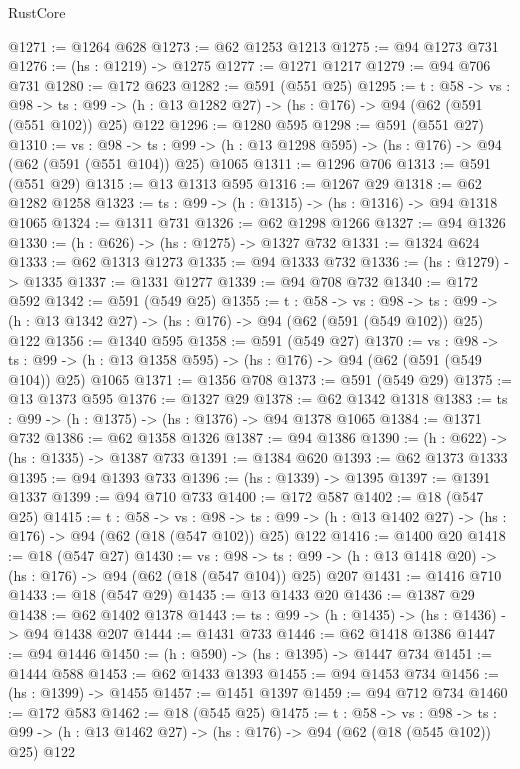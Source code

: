 \begin{lexlean}{RustCore}
\begin{coremodule}
@1271 := @1264 @628
@1273 := @62 @1253 @1213
@1275 := @94 @1273 @731
@1276 := (hs : @1219) -> @1275
@1277 := @1271 @1217
@1279 := @94 @706 @731
@1280 := @172 @623
@1282 := @591 (@551 @25)
@1295 := {t : @58} ->
  {vs : @98} ->
  {ts : @99} -> (h : @13 @1282 @27) -> (hs : @176) -> @94 (@62 (@591 (@551 @102)) @25) @122
@1296 := @1280 @595
@1298 := @591 (@551 @27)
@1310 := {vs : @98} ->
  {ts : @99} -> (h : @13 @1298 @595) -> (hs : @176) -> @94 (@62 (@591 (@551 @104)) @25) @1065
@1311 := @1296 @706
@1313 := @591 (@551 @29)
@1315 := @13 @1313 @595
@1316 := @1267 @29
@1318 := @62 @1282 @1258
@1323 := {ts : @99} -> (h : @1315) -> (hs : @1316) -> @94 @1318 @1065
@1324 := @1311 @731
@1326 := @62 @1298 @1266
@1327 := @94 @1326
@1330 := (h : @626) -> (hs : @1275) -> @1327 @732
@1331 := @1324 @624
@1333 := @62 @1313 @1273
@1335 := @94 @1333 @732
@1336 := (hs : @1279) -> @1335
@1337 := @1331 @1277
@1339 := @94 @708 @732
@1340 := @172 @592
@1342 := @591 (@549 @25)
@1355 := {t : @58} ->
  {vs : @98} ->
  {ts : @99} -> (h : @13 @1342 @27) -> (hs : @176) -> @94 (@62 (@591 (@549 @102)) @25) @122
@1356 := @1340 @595
@1358 := @591 (@549 @27)
@1370 := {vs : @98} ->
  {ts : @99} -> (h : @13 @1358 @595) -> (hs : @176) -> @94 (@62 (@591 (@549 @104)) @25) @1065
@1371 := @1356 @708
@1373 := @591 (@549 @29)
@1375 := @13 @1373 @595
@1376 := @1327 @29
@1378 := @62 @1342 @1318
@1383 := {ts : @99} -> (h : @1375) -> (hs : @1376) -> @94 @1378 @1065
@1384 := @1371 @732
@1386 := @62 @1358 @1326
@1387 := @94 @1386
@1390 := (h : @622) -> (hs : @1335) -> @1387 @733
@1391 := @1384 @620
@1393 := @62 @1373 @1333
@1395 := @94 @1393 @733
@1396 := (hs : @1339) -> @1395
@1397 := @1391 @1337
@1399 := @94 @710 @733
@1400 := @172 @587
@1402 := @18 (@547 @25)
@1415 := {t : @58} ->
  {vs : @98} ->
  {ts : @99} -> (h : @13 @1402 @27) -> (hs : @176) -> @94 (@62 (@18 (@547 @102)) @25) @122
@1416 := @1400 @20
@1418 := @18 (@547 @27)
@1430 := {vs : @98} ->
  {ts : @99} -> (h : @13 @1418 @20) -> (hs : @176) -> @94 (@62 (@18 (@547 @104)) @25) @207
@1431 := @1416 @710
@1433 := @18 (@547 @29)
@1435 := @13 @1433 @20
@1436 := @1387 @29
@1438 := @62 @1402 @1378
@1443 := {ts : @99} -> (h : @1435) -> (hs : @1436) -> @94 @1438 @207
@1444 := @1431 @733
@1446 := @62 @1418 @1386
@1447 := @94 @1446
@1450 := (h : @590) -> (hs : @1395) -> @1447 @734
@1451 := @1444 @588
@1453 := @62 @1433 @1393
@1455 := @94 @1453 @734
@1456 := (hs : @1399) -> @1455
@1457 := @1451 @1397
@1459 := @94 @712 @734
@1460 := @172 @583
@1462 := @18 (@545 @25)
@1475 := {t : @58} ->
  {vs : @98} ->
  {ts : @99} -> (h : @13 @1462 @27) -> (hs : @176) -> @94 (@62 (@18 (@545 @102)) @25) @122

\end{coremodule}
\end{lexlean}

